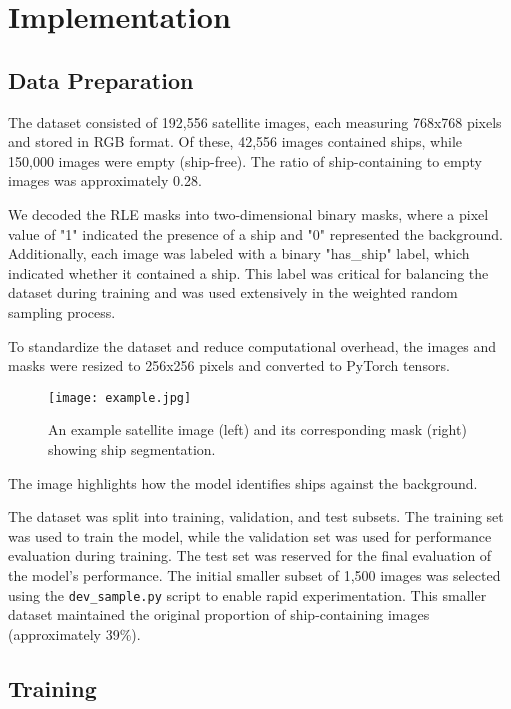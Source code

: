 \documentclass{article}
\begin{document}
\section{Implementation}

\subsection{Data Preparation}

The dataset consisted of 192,556 satellite images, each measuring 768x768 pixels and stored in RGB format. Of these, 42,556 images contained ships, while 150,000 images were empty (ship-free). The ratio of ship-containing to empty images was approximately 0.28.

We decoded the RLE masks into two-dimensional binary masks, where a pixel value of "1" indicated the presence of a ship and "0" represented the background. Additionally, each image was labeled with a binary "has\_ship" label, which indicated whether it contained a ship. This label was critical for balancing the dataset during training and was used extensively in the weighted random sampling process.

To standardize the dataset and reduce computational overhead, the images and masks were resized to 256x256 pixels and converted to PyTorch tensors.

\begin{figure}[h]
    \centering
    \texttt{[image: example.jpg]}
    \caption{An example satellite image (left) and its corresponding mask (right) showing ship segmentation.}
    \label{fig:image_and_mask}
\end{figure}

The image highlights how the model identifies ships against the background.

The dataset was split into training, validation, and test subsets. The training set was used to train the model, while the validation set was used for performance evaluation during training. The test set was reserved for the final evaluation of the model's performance. The initial smaller subset of 1,500 images was selected using the \texttt{dev\_sample.py} script to enable rapid experimentation. This smaller dataset maintained the original proportion of ship-containing images (approximately 39\%).

\subsection{Training}
\end{document}
